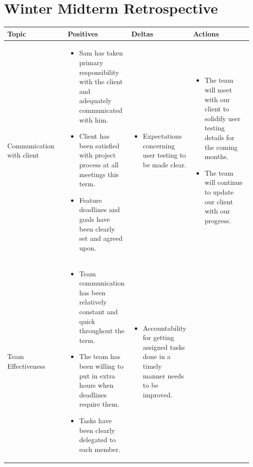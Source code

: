 \documentclass[letterpaper,10pt,titlepage,draftclsnofoot,onecolumn,onesided] {IEEEtran}
\begin{document}
\pagebreak
\section{Winter Midterm Retrospective}
	\begin{center}
	\begin{singlespace}
		\begin{tabular}{ |  p{0.25\linewidth}  |  p{0.25\linewidth}  | p{0.25\linewidth} | p{0.25\linewidth} |}
		\hline
		Topic & Positives & Deltas & Actions \\ \hline
		
			Communication with client 
		& 
			\begin{itemize}
				\item Sam has taken primary responsibility with the client and adequately communicated with him.
				\item Client has been satisfied with project process at all meetings this term.
				\item Feature deadlines and goals have been clearly set and agreed upon.
			\end{itemize}
		& 
			\begin{itemize}
				\item Expectations concerning user testing to be made clear.
			\end{itemize}
		&
			\begin{itemize}
				\item The team will meet with our client to solidify user testing details for the coming months.
				\item The team will continue to update our client with our progress.
			\end{itemize} 
		\\ \hline
			Team Effectiveness 
		& 
			\begin{itemize}
				\item Team communication has been relatively constant and quick throughout the term.
				\item The team has been willing to put in extra hours when deadlines require them.
				\item Tasks have been clearly delegated to each member.
			\end{itemize}
		& 
			\begin{itemize}
				\item Accountability for getting assigned tasks done in a timely manner needs to be improved.
			\end{itemize}
		&
			\begin{itemize}

\end{itemize}
\end{tabular}
\end{singlespace}
\end{center}
\end{document}
